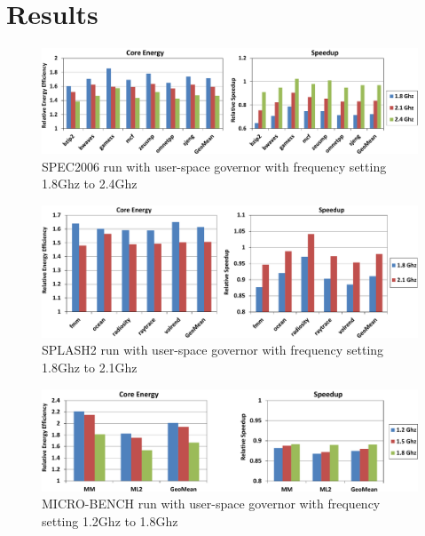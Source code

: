 \section{Results}\label{sec:results}

\begin{figure}[htp]
  \begin{center}
\includegraphics[width=\linewidth]{figs/user-spec-crop.pdf}
  \end{center}
	\vspace{-0.1in}
  \caption{SPEC2006 run with user-space governor with frequency setting 1.8Ghz to 2.4Ghz}
  \label{fig:user-spec}
\end{figure}

\begin{figure}[h]
  \begin{center}
\includegraphics[width=\linewidth]{figs/user-splash-crop.pdf}
	\end{center}
	\vspace{-0.1in}
  \caption{SPLASH2 run with user-space governor with frequency setting 1.8Ghz to 2.1Ghz}
  \label{fig:user-splash}
\end{figure}

\begin{figure}[h]
  \begin{center}
\includegraphics[width=\linewidth]{figs/user-micro-crop.pdf}
	\end{center}
	\vspace{-0.1in}
  \caption{MICRO-BENCH run with user-space governor with frequency setting 1.2Ghz to 1.8Ghz}
  \label{fig:user-micro}
\end{figure}


